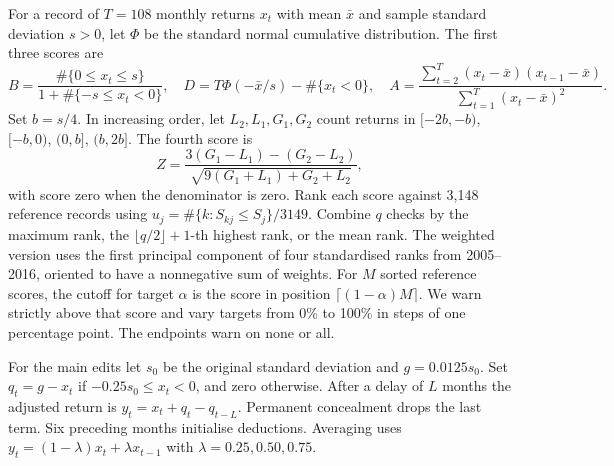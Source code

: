 \documentclass[11pt,letterpaper]{article}
\newcommand{\subhead}[1]{\vspace{3pt}{\large\bfseries #1}\par}
\begin{document}
\subhead{Exact calculations}
For a record of $T=108$ monthly returns $x_t$ with mean $\bar x$ and sample standard deviation $s>0$, let $\Phi$ be the standard normal cumulative distribution. The first three scores are
\[
 B=\frac{\#\{0\leq x_t\leq s\}}{1+\#\{-s\leq x_t<0\}},\quad
 D=T\Phi(-\bar x/s)-\#\{x_t<0\},\quad
 A=\frac{\sum_{t=2}^T(x_t-\bar x)(x_{t-1}-\bar x)}{\sum_{t=1}^T(x_t-\bar x)^2}.
\]
Set $b=s/4$. In increasing order, let $L_2,L_1,G_1,G_2$ count returns in $[-2b,-b)$, $[-b,0)$, $(0,b]$, $(b,2b]$. The fourth score is
\[
 Z=\frac{3(G_1-L_1)-(G_2-L_2)}{\sqrt{9(G_1+L_1)+G_2+L_2}},
\]
with score zero when the denominator is zero. Rank each score against 3,148 reference records using $u_j=\#\{k:S_{kj}\leq S_j\}/3149$. Combine $q$ checks by the maximum rank, the $\lfloor q/2\rfloor+1$-th highest rank, or the mean rank. The weighted version uses the first principal component of four standardised ranks from 2005--2016, oriented to have a nonnegative sum of weights. For $M$ sorted reference scores, the cutoff for target $\alpha$ is the score in position $\lceil(1-\alpha)M\rceil$. We warn strictly above that score and vary targets from 0\% to 100\% in steps of one percentage point. The endpoints warn on none or all.

For the main edits let $s_0$ be the original standard deviation and $g=0.0125s_0$. Set $q_t=g-x_t$ if $-0.25s_0\leq x_t<0$, and zero otherwise. After a delay of $L$ months the adjusted return is $y_t=x_t+q_t-q_{t-L}$. Permanent concealment drops the last term. Six preceding months initialise deductions. Averaging uses $y_t=(1-\lambda)x_t+\lambda x_{t-1}$ with $\lambda=0.25,0.50,0.75$.
\end{document}

